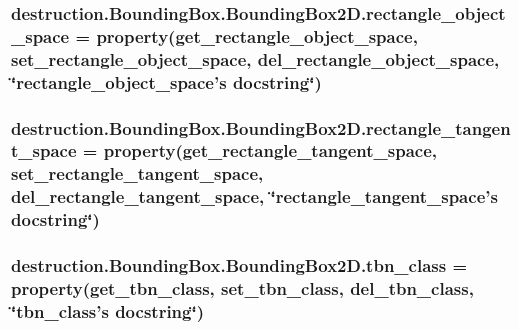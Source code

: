 \hypertarget{classdestruction_1_1_bounding_box_1_1_bounding_box2_d_ad84d26b6adab2ff4c5759613b26c909c}{
\subsubsection[{rectangle\-\_\-object\-\_\-space}]{\setlength{\rightskip}{0pt plus 5cm}destruction.\-Bounding\-Box.\-Bounding\-Box2\-D.\-rectangle\-\_\-object\-\_\-space = property({\bf get\-\_\-rectangle\-\_\-object\-\_\-space}, {\bf set\-\_\-rectangle\-\_\-object\-\_\-space}, {\bf del\-\_\-rectangle\-\_\-object\-\_\-space}, \char`\"{}rectangle\-\_\-object\-\_\-space's docstring\char`\"{})\hspace{0.3cm}{\ttfamily [static]}}}\label{classdestruction_1_1_bounding_box_1_1_bounding_box2_d_ad84d26b6adab2ff4c5759613b26c909c}
\hypertarget{classdestruction_1_1_bounding_box_1_1_bounding_box2_d_a389f3819e70ac8d28b6d52fbe84b8a2f}{
\subsubsection[{rectangle\-\_\-tangent\-\_\-space}]{\setlength{\rightskip}{0pt plus 5cm}destruction.\-Bounding\-Box.\-Bounding\-Box2\-D.\-rectangle\-\_\-tangent\-\_\-space = property({\bf get\-\_\-rectangle\-\_\-tangent\-\_\-space}, {\bf set\-\_\-rectangle\-\_\-tangent\-\_\-space}, {\bf del\-\_\-rectangle\-\_\-tangent\-\_\-space}, \char`\"{}rectangle\-\_\-tangent\-\_\-space's docstring\char`\"{})\hspace{0.3cm}{\ttfamily [static]}}}\label{classdestruction_1_1_bounding_box_1_1_bounding_box2_d_a389f3819e70ac8d28b6d52fbe84b8a2f}
\hypertarget{classdestruction_1_1_bounding_box_1_1_bounding_box2_d_a482bab9ede116f3d4804dbe377e14311}{
\subsubsection[{tbn\-\_\-class}]{\setlength{\rightskip}{0pt plus 5cm}destruction.\-Bounding\-Box.\-Bounding\-Box2\-D.\-tbn\-\_\-class = property({\bf get\-\_\-tbn\-\_\-class}, {\bf set\-\_\-tbn\-\_\-class}, {\bf del\-\_\-tbn\-\_\-class}, \char`\"{}tbn\-\_\-class's docstring\char`\"{})\hspace{0.3cm}{\ttfamily [static]}}}\label{classdestruction_1_1_bounding_box_1_1_bounding_box2_d_a482bab9ede116f3d4804dbe377e14311}
